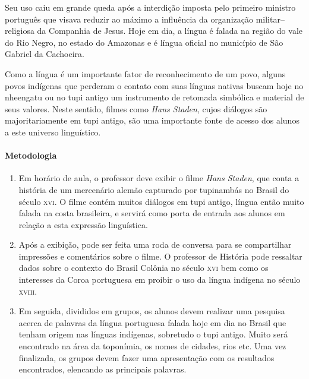 \documentclass[12pt]{extarticle}
\begin{document}
{Seu uso caiu em grande queda após a interdição imposta pelo primeiro
ministro português que visava reduzir ao máximo a influência da organização
militar--religiosa da Companhia de Jesus. Hoje em dia, a língua é falada
na região do vale do Rio Negro, no estado do Amazonas e é língua oficial 
no município de São Gabriel da Cachoeira. 

Como a língua é um importante fator de reconhecimento de um povo, 
alguns povos indígenas que perderam o contato com suas línguas nativas
buscam hoje no nheengatu ou no tupi antigo um instrumento de retomada
simbólica e material de seus valores. Neste sentido, filmes como \emph{Hans Staden},
cujos diálogos são majoritariamente em tupi antigo, são uma importante 
fonte de acesso dos alunos a este universo linguístico.  

\paragraph{Metodologia}

\begin{enumerate}

\item 
Em horário de aula, o professor deve exibir o filme \emph{Hans Staden},
que conta a história de um mercenário alemão capturado por tupinambás 
no Brasil do século \textsc{xvi}. O filme contém muitos diálogos em 
tupi antigo, língua então muito falada na costa brasileira, e servirá
como porta de entrada aos alunos em relação a esta expressão linguística.

\item 
Após a exibição, pode ser feita uma roda de conversa para se
compartilhar impressões e comentários sobre o filme. O professor de 
História pode ressaltar dados sobre o contexto do Brasil Colônia no 
século \textsc{xvi} bem como os interesses da Coroa portuguesa em proibir
o uso da língua indígena no século \textsc{xviii}.

\item 
Em seguida, divididos em grupos, os alunos devem realizar uma pesquisa 
acerca de palavras da língua portuguesa falada hoje em dia no Brasil 
que tenham origem nas línguas indígenas, sobretudo o tupi antigo. 
Muito será encontrado na área da toponímia, os nomes de cidades, rios etc.
Uma vez finalizada, os grupos devem fazer uma apresentação com os 
resultados encontrados, elencando as principais palavras. 
\end{enumerate}

}
\end{document}
